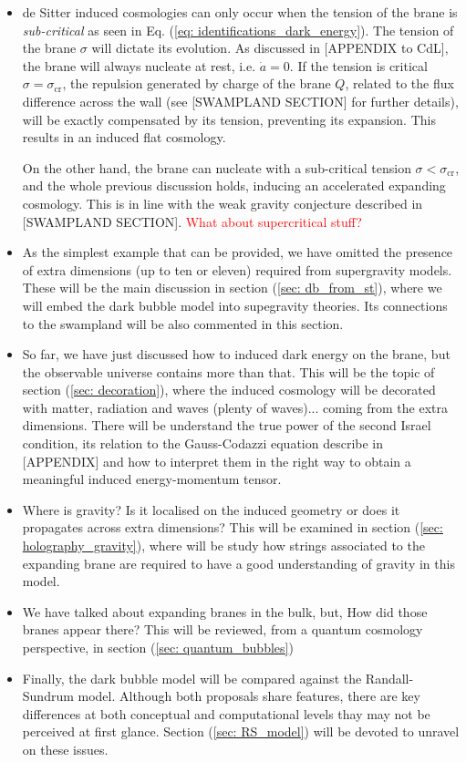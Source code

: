 \begin{itemize}
	\item de Sitter induced cosmologies can only occur when the tension of the brane is \textit{sub-critical} as seen in Eq. (\ref{eq: identifications_dark_energy}). The tension of the brane $\sigma$ will dictate its evolution. As discussed in [APPENDIX to CdL], the brane will always nucleate at rest, i.e. $\dot{a} = 0$. If the tension is critical $\sigma = \sigma_{\text{cr}}$, the repulsion generated by charge of the brane $Q$, related to the flux difference across the wall (see [SWAMPLAND SECTION] for further details), will be exactly compensated by its tension, preventing its expansion. This results in an induced flat cosmology.
	
	On the other hand, the brane can nucleate with a sub-critical tension $\sigma < \sigma_{\text{cr}}$, and the whole previous discussion holds, inducing an accelerated expanding cosmology. This is in line with the weak gravity conjecture described in [SWAMPLAND SECTION]. \textcolor{red}{What about supercritical stuff?}

	\item As the simplest example that can be provided, we have omitted the presence of extra dimensions (up to ten or eleven) required from supergravity models. These will be the main discussion in section (\ref{sec: db_from_st}), where we will embed the dark bubble model into supegravity theories. Its connections to the swampland will be also commented in this section.

	\item So far, we have just discussed how to induced dark energy on the brane, but the observable universe contains more than that. This will be the topic of section (\ref{sec: decoration}), where the induced cosmology will be decorated with matter, radiation and waves (plenty of waves)... coming from the extra dimensions. There will be understand the true power of the second Israel condition, its relation to the Gauss-Codazzi equation describe in [APPENDIX] and how to interpret them in the right way to obtain a meaningful induced energy-momentum tensor.
	
	\item Where is gravity? Is it localised on the induced geometry or does it propagates across extra dimensions? This will be examined in section (\ref{sec: holography_gravity}), where will be study how strings associated to the expanding brane are required to have a good understanding of gravity in this model.
	
	\item We have talked about expanding branes in the bulk, but, How did those branes appear there? This will be reviewed, from a quantum cosmology perspective, in section (\ref{sec: quantum_bubbles})
	
	\item Finally, the dark bubble model will be compared against the Randall-Sundrum model. Although both proposals share features, there are key differences at both conceptual and computational levels thay may not be perceived at first glance. Section (\ref{sec: RS_model}) will be devoted to unravel on these issues.
\end{itemize}